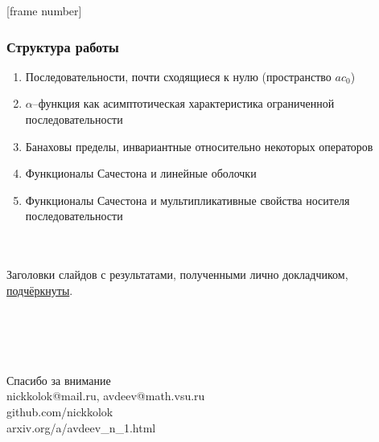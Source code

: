 \documentclass[10pt,pdf,hyperref={unicode},aspectratio=169,color={usenames, dvipsnames}]{beamer}
\theoremstyle{definition}
\begin{document}


[frame number]




\begin{frame}\frametitle{Структура работы}
	\begin{enumerate}
		\item
			Последовательности, почти сходящиеся к нулю
			(пространство $ac_0$)
		\item
			$\alpha$--функция как асимптотическая характеристика ограниченной последовательности
		\item
			Банаховы пределы, инвариантные относительно некоторых операторов
		\item
			Функционалы Сачестона и линейные оболочки
		\item
			Функционалы Сачестона и мультипликативные свойства носителя последовательности
	\end{enumerate}

	~\\~\\
	Заголовки слайдов с результатами, полученными лично докладчиком, \underline{подчёркнуты}.
\end{frame}
















\begin{frame}
	\printbibliography{}
\end{frame}


\begin{frame}
	{
		\huge\centering
		~\\~\\~\\~\\
		Спасибо за внимание
	}
	~\\
	\vspace{6.28em}
	nickkolok@mail.ru, avdeev@math.vsu.ru
	\\
	github.com/nickkolok
	\\
	arxiv.org/a/avdeev\_n\_1.html
\end{frame}
\end{document}
